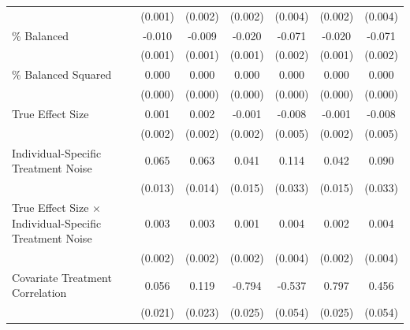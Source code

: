 \documentclass[12pt]{article}
\begin{document}
\begin{table}[htbp]
{\begin{tabular}{p{4.5in}|*{6}{c}}
                    &     (0.001)         &     (0.002)         &     (0.002)         &     (0.004)         &     (0.002)         &     (0.004)         \\
\% Balanced          &      -0.010\sym{***}&      -0.009\sym{***}&      -0.020\sym{***}&      -0.071\sym{***}&      -0.020\sym{***}&      -0.071\sym{***}\\
                    &     (0.001)         &     (0.001)         &     (0.001)         &     (0.002)         &     (0.001)         &     (0.002)         \\
\% Balanced Squared  &       0.000\sym{***}&       0.000\sym{***}&       0.000\sym{***}&       0.000\sym{***}&       0.000\sym{***}&       0.000\sym{***}\\
                    &     (0.000)         &     (0.000)         &     (0.000)         &     (0.000)         &     (0.000)         &     (0.000)         \\
True Effect Size    &       0.001         &       0.002         &      -0.001         &      -0.008         &      -0.001         &      -0.008         \\
                    &     (0.002)         &     (0.002)         &     (0.002)         &     (0.005)         &     (0.002)         &     (0.005)         \\
Individual-Specific Treatment Noise&       0.065\sym{***}&       0.063\sym{***}&       0.041\sym{**} &       0.114\sym{***}&       0.042\sym{**} &       0.090\sym{**} \\
                    &     (0.013)         &     (0.014)         &     (0.015)         &     (0.033)         &     (0.015)         &     (0.033)         \\
True Effect Size $\times$ Individual-Specific Treatment Noise&       0.003         &       0.003         &       0.001         &       0.004         &       0.002         &       0.004         \\
                    &     (0.002)         &     (0.002)         &     (0.002)         &     (0.004)         &     (0.002)         &     (0.004)         \\
Covariate Treatment Correlation&       0.056\sym{**} &       0.119\sym{***}&      -0.794\sym{***}&      -0.537\sym{***}&       0.797\sym{***}&       0.456\sym{***}\\
                    &     (0.021)         &     (0.023)         &     (0.025)         &     (0.054)         &     (0.025)         &     (0.054)         \\

\end{tabular}}
\end{table}
\end{document}
